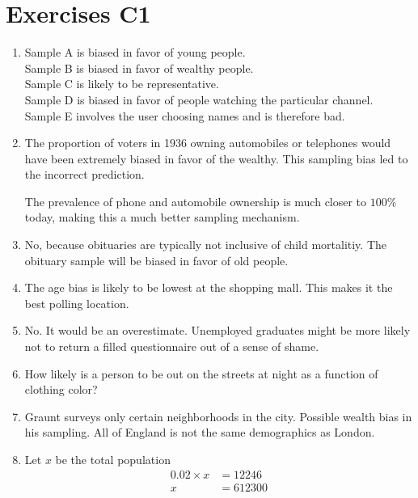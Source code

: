 \chapter*{Exercises C1}

\begin{enumerate}
	\item Sample A is biased in favor of young people. \\ Sample B is biased in favor of wealthy people.  \\ Sample C is likely to be representative. \\ Sample D is biased in favor of people watching the particular channel. \\ Sample E involves the user choosing names and is therefore bad.
	
	\item The proportion of voters in 1936 owning automobiles or telephones would have been extremely biased in favor of the wealthy. This sampling bias led to the incorrect prediction.
	
	The prevalence of phone and automobile ownership is much closer to $ 100 \% $ today, making this a much better sampling mechanism. 
	
	\item No, because obituaries are typically not inclusive of child mortalitiy. The obituary sample will be biased in favor of old people.
	
	\item The age bias is likely to be lowest at the shopping mall. This makes it the best polling location.
	
	\item No. It would be an overestimate. Unemployed graduates might be more likely not to return a filled questionnaire out of a sense of shame. 
	
	\item How likely is a person to be out on the streets at night as a function of clothing color? 
	
	\item Graunt surveys only certain neighborhoods in the city. Possible wealth bias in his sampling. All of England is not the same demographics as London.
	
	\item Let $ x $ be the total population \\
	
	\begin{subequations}
		\begin{align}
			0.02 \times x &= 12246 \\
			x &= 612300
		\end{align}
	\end{subequations}
	

\end{enumerate}
